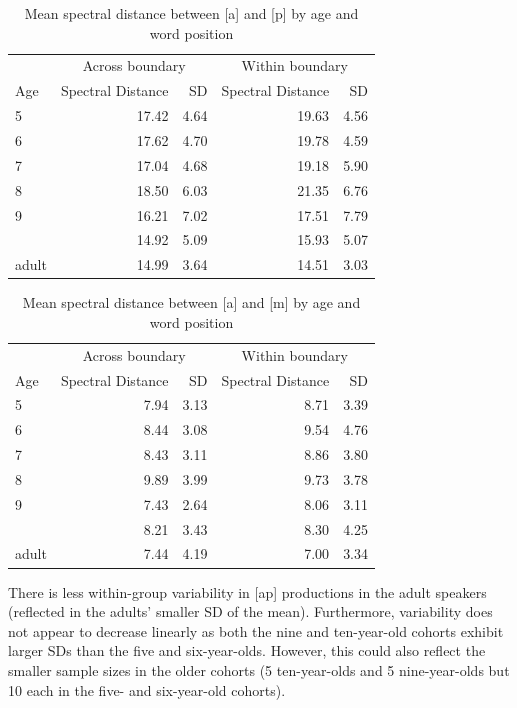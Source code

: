 \documentclass[a4paper,man,floatsintext,natbib,donotrepeattitle, apacite]{apa6}
\begin{document}
\begin{table}[H]

\caption{\label{tab:ap-coartic-tbl}Mean spectral distance between [a] and [p] by age and word position}
\centering
\begin{tabular}[t]{lrrrr}
\toprule
\multicolumn{1}{c}{ } & \multicolumn{2}{c}{Across boundary} & \multicolumn{2}{c}{Within boundary} \\
\cmidrule(l{3pt}r{3pt}){2-3} \cmidrule(l{3pt}r{3pt}){4-5}
Age & Spectral Distance  & SD  & Spectral Distance & SD\\
\midrule
5 & 17.42 & 4.64 & 19.63 & 4.56\\
6 & 17.62 & 4.70 & 19.78 & 4.59\\
7 & 17.04 & 4.68 & 19.18 & 5.90\\
8 & 18.50 & 6.03 & 21.35 & 6.76\\
9 & 16.21 & 7.02 & 17.51 & 7.79\\
\addlinespace
10 & 14.92 & 5.09 & 15.93 & 5.07\\
adult & 14.99 & 3.64 & 14.51 & 3.03\\
\bottomrule
\end{tabular}
\end{table}

\begin{table}[H]

\caption{\label{tab:am-coartic-tbl}Mean spectral distance between [a] and [m] by age and word position}
\centering
\begin{tabular}[t]{lrrrr}
\toprule
\multicolumn{1}{c}{ } & \multicolumn{2}{c}{Across boundary} & \multicolumn{2}{c}{Within boundary} \\
\cmidrule(l{3pt}r{3pt}){2-3} \cmidrule(l{3pt}r{3pt}){4-5}
Age & Spectral Distance  & SD  & Spectral Distance & SD\\
\midrule
5 & 7.94 & 3.13 & 8.71 & 3.39\\
6 & 8.44 & 3.08 & 9.54 & 4.76\\
7 & 8.43 & 3.11 & 8.86 & 3.80\\
8 & 9.89 & 3.99 & 9.73 & 3.78\\
9 & 7.43 & 2.64 & 8.06 & 3.11\\
\addlinespace
10 & 8.21 & 3.43 & 8.30 & 4.25\\
adult & 7.44 & 4.19 & 7.00 & 3.34\\
\bottomrule
\end{tabular}
\end{table}


There is less within-group variability in {[}ap{]} productions in the adult speakers (reflected in the adults' smaller SD of the mean). Furthermore, variability does not appear to decrease linearly as both the nine and ten-year-old cohorts exhibit larger SDs than the five and six-year-olds. However, this could also reflect the smaller sample sizes in the older cohorts (5 ten-year-olds and 5 nine-year-olds but 10 each in the five- and six-year-old cohorts).
\end{document}
